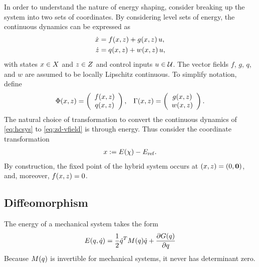 \documentclass[twocolumn]{article}
\begin{document}
In order to understand the nature of energy shaping, consider breaking up the system into two sets of coordinates.
%
By considering level sets of energy, the continuous dynamics can be expressed as
\begin{align}
  \nonumber
  \dot {x} &= f(x, z) + g(x, z) \, u,\\
  \dot {z} &= q(x, z) + w(x, z) \, u,
  \label{eq:zd-vfield}
\end{align}
%
with states $x \in X$ and $z \in Z$ and control inputs $u \in \mathcal{U}$.
%
The vector fields $f$, $g$, $q$, and $w$ are assumed to be locally Lipschitz continuous.
%
To simplify notation, define
\begin{align}
  \Phi(x, z) = \left(\begin{array}{c}
    f(x, z)\\
    q(x, z)
  \end{array}\right),&&
  \Gamma (x, z) = \left(\begin{array}{c}
    g(x, z)\\
    w(x, z)
  \end{array}\right).
\end{align}
%
The natural choice of transformation to convert the continuous dynamics of \eqref{eq:hcsys} to \eqref{eq:zd-vfield} is through energy.
%
Thus consider the coordinate transformation
\begin{align}
  x := E(\chi) - E_{\mathrm{ref}}.
\end{align}
By construction, the fixed point of the hybrid system occurs at $(x, z) = (0, {\mathbf 0})$, and, moreover, $f(x, z) = 0$.
%

\subsection{Diffeomorphism}
The energy of a mechanical system takes the form
\begin{align}
  E(q, \dot{q}) = \frac{1}{2} \dot{q}^{T} M(q) \dot{q} + \frac{\partial{G(q)}}{\partial{q}}
\end{align}
Because $M(q)$ is invertible for mechanical systems, it never has determinant zero.
\end{document}
